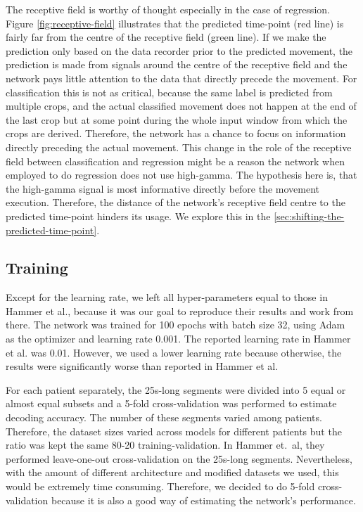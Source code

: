 The receptive field is worthy of thought especially in the case of regression.
Figure \ref{fig:receptive-field} illustrates that the predicted time-point (red line) is fairly far from the centre of the receptive field (green line).
If we make the prediction only based on the data recorder prior to the predicted movement, the prediction is made from signals around the centre of the receptive field and the network pays little attention to the data that directly precede the movement.
For classification this is not as critical, because the same label is predicted from multiple crops, and the actual classified movement does not happen at the end of the last crop but at some point during the whole input window from which the crops are derived.
Therefore, the network has a chance to focus on information directly preceding the actual movement.
This change in the role of the receptive field between classification and regression might be a reason the network when employed to do regression does not use high-gamma.
The hypothesis here is, that the high-gamma signal is most informative directly before the movement execution.
Therefore, the distance of the network's receptive field centre to the predicted time-point hinders its usage.
We explore this in the \cref{sec:shifting-the-predicted-time-point}.

\subsection{Training}
Except for the learning rate, we left all hyper-parameters equal to those in Hammer et al., because it was our goal to reproduce their results and work from there.
The network was trained for 100 epochs with batch size 32, using Adam~\cite{kingma-adam-2017} as the optimizer and learning rate 0.001.
The reported learning rate in Hammer et al. was 0.01.
However, we used a lower learning rate because otherwise, the results were significantly worse than reported in Hammer et al.

For each patient separately, the 25s-long segments were divided into 5 equal or almost equal subsets and a 5-fold cross-validation was performed to estimate decoding accuracy.
The number of these segments varied among patients.
Therefore, the dataset sizes varied across models for different patients but the ratio was kept the same 80-20 training-validation.
In Hammer et.\ al, they performed leave-one-out cross-validation on the 25s-long segments.
Nevertheless, with the amount of different architecture and modified datasets we used, this would be extremely time consuming.
Therefore, we decided to do 5-fold cross-validation because it is also a good way of estimating the network's performance.

